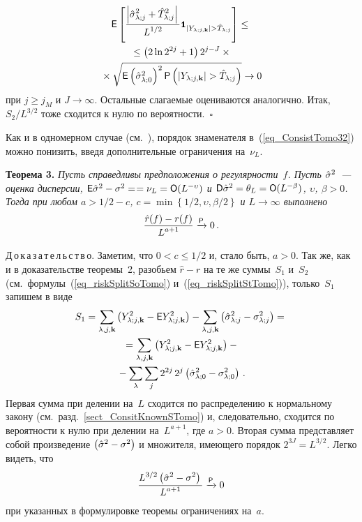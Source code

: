 \begin{multicols}{2}
\vspace*{-6pt}
\noindent
\begin{multline*}
\e\left[\fr{\left| \hslj + \hTlj^2 \right|}{L^{1/2}}\indYjkghTj\right] \leq{}\\
{}\leq 
\left( 2\ln 2^{2j} + 1 \right) 2^{j-J} \times{}\\
{}\times\sqrt{ \e\left(\hslz\right)^2 \p\left( |\Yljk| > \hTlj \right) } \rightarrow 0
\end{multline*}
при $j\geq j_M$ и $J\rightarrow\infty$.
Остальные слагаемые оцениваются аналогично. Итак, $S_2/L^{3/2}$ тоже сходится к нулю по вероятности.~$\square$

\smallskip

Как и в одномерном случае (см.~\cite{MarkinLimitDistr}), порядок знаменателя в~(\ref{eq_ConsistTomo32}) 
можно понизить, введя дополнительные ограничения на~$\nu_L$.

\medskip

\noindent
\textbf{Теорема 3.}
\textit{Пусть справедливы предположения о регулярности~$f$. Пусть $\hat\sigma^2$~--- 
оценка дисперсии, ${\sf E}\hat\sigma^2-\sigma^2=$\linebreak $=\nu_L=\textsf{O}(L^{-\upsilon})$ и 
${\sf D}\hat\sigma^2=\theta_L=\textsf{O}(L^{-\beta})$, $\upsilon$, $\beta>0$. Тогда
при любом $a>1/2-c$, $c=\min\left\{1/2, \upsilon, \beta/2\right\}$ и $L\rightarrow\infty$ выполнено
\begin{equation*}
\displaystyle\frac{\displaystyle \hat r(f)-r(f)\mathstrut}{\displaystyle L^{a+1}\mathstrut} \xrightarrow{\textsf{P}} 0\,.
\end{equation*}}
\medskip

\noindent
Д\,о\,к\,а\,з\,а\,т\,е\,л\,ь\,с\,т\,в\,о.
Заметим, что $0<c\leq 1/2$ и, стало быть, $a>0$. Так же, как и в доказательстве теоремы~2, 
разобьем $\hat r - r$ на те же суммы~$S_1$ и~$S_2$ (см.\ формулы~(\ref{eq_riskSplitSoTomo})
и~(\ref{eq_riskSplitStTomo})), только~$S_1$ запишем в виде
\begin{multline*}
S_1 = \sum\limits_{\lambda,j,\mathbf{k}}\left(Y_{\lambda;j,\mathbf{k}}^2-{\sf E}Y_{\lambda;j,\mathbf{k}}^2\right) - \sum\limits_{\lambda,j,\mathbf{k}} \left(\hat\sigma^2_{\lambda;j}-\sigma_{\lambda;j}^2\right) = {}\\
{}= \sum\limits_{\lambda,j,\mathbf{k}}\left(Y_{\lambda;j,\mathbf{k}}^2-{\sf E}Y_{\lambda;j,\mathbf{k}}^2\right) - {}\\
{}-\sum\limits_\lambda \sum_j 2^{2j}\,2^j \left(\hat\sigma_{\lambda;0}^2-\sigma_{\lambda;0}^2\right)\,.
\end{multline*}
Первая сумма при делении на~$L$ сходится по распределению к нормальному закону 
(см.\ разд.~\ref{sect_ConsitKnownSTomo}) и, следовательно, сходится по вероятности к нулю при делении 
на~$L^{a+1}$, где $a>0$. Вторая сумма пред\-став\-ля\-ет собой произведение 
$\left(\hat\sigma^2-\sigma^2\right)$ и множителя, имеющего порядок $2^{3J}=L^{3/2}$. Легко видеть, что
\begin{equation*}
\displaystyle\frac{\displaystyle L^{3/2}\left(\hat\sigma^2-\sigma^2\right)\mathstrut}{\displaystyle L^{a+1}\mathstrut} \xrightarrow{\textsf{P}} 0
\end{equation*}
при указанных в формулировке теоремы ограничениях на~$a$.


\end{multicols}
